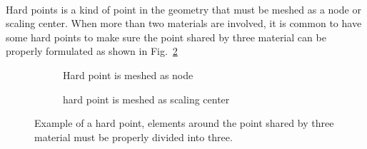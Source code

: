 \paragraph{}
Hard points is a kind of point in the geometry that must be meshed as a node or scaling center.
When more than two materials are involved, it is common to have some hard points to make sure the point shared by three material can be properly formulated as shown in Fig.~\ref{qdt_fig:qdt_hard_point_demo}
    \begin{figure}[h!]
        \begin{subfigure}[b]{0.5\linewidth}
            \centering
        \caption{Hard point is meshed as node}
        \end{subfigure}
        \begin{subfigure}[b]{0.5\linewidth}
            \centering
        \caption{hard point is meshed as scaling center}
        \label{qdt_fig:qdt_hard_point_demo_sc}
        \end{subfigure}
        \caption[Example of a hard point]{Example of a hard point, elements around the point shared by three material must be properly divided into three.}
        \label{qdt_fig:qdt_hard_point_demo}
    \end{figure}
